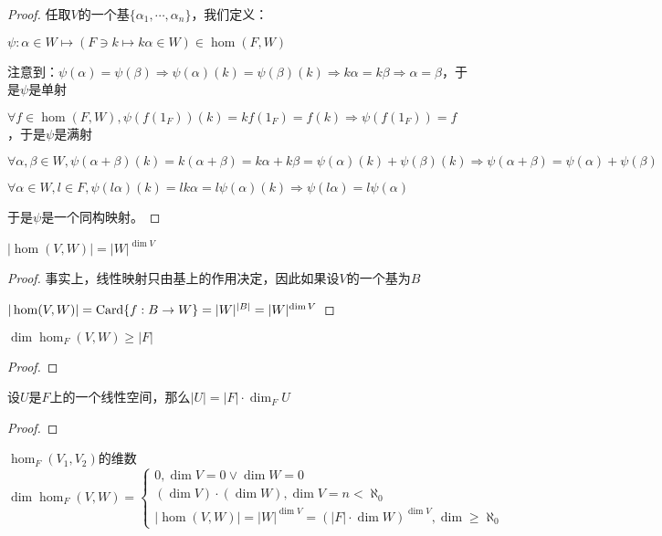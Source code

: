 \documentclass[12pt, a4paper, oneside, UTF8]{ctexbook}
\begin{document}
			\begin{proof}
				任取$V$的一个基$\{\alpha_1,\cdots,\alpha_n\}$，我们定义：

				$\psi : \alpha \in W \mapsto \left(F \ni k \mapsto k\alpha \in W\right) \in \hom(F,W)$

				注意到：$\psi  (\alpha )=\psi  (\beta ) \Rightarrow \psi  (\alpha )(k)=\psi  (\beta )(k) \Rightarrow k\alpha =k\beta \Rightarrow \alpha =\beta $，于是$\psi  $是单射

				$\forall f \in \hom(F,W),\psi  (f(1_F))(k)=kf(1_F)=f(k)\Rightarrow \psi  (f(1_F))=f$，于是$\psi $是满射

				$\forall \alpha ,\beta \in W,\psi (\alpha +\beta )(k)=k(\alpha +\beta )=k\alpha +k\beta =\psi (\alpha )(k)+\psi (\beta )(k) \Rightarrow \psi (\alpha +\beta )=\psi (\alpha )+\psi (\beta )$

				$\forall \alpha \in W,l \in F,\psi (l\alpha )(k)=lk\alpha =l\psi (\alpha )(k) \Rightarrow \psi (l\alpha )=l\psi (\alpha )$

				于是$\psi $是一个同构映射。
			\end{proof}
			\begin{lemma}{}{}
				$|\hom(V,W)|=|W|^{\dim V}$
			\end{lemma}
			\begin{proof}
				事实上，线性映射只由基上的作用决定，因此如果设$V$的一个基为$B$

				$|\hom(V,W)|=\operatorname{Card} \{f:B \to W\}=|W|^{|B|}=|W|^{\dim V}$
			\end{proof}
			\begin{lemma}{}{}
				$\dim \hom_F (V,W) \geqslant |F|$
			\end{lemma}
			\begin{proof}
				
			\end{proof}
			\begin{lemma}{}{}
				设$U$是$F$上的一个线性空间，那么$|U|=|F|\cdot \dim_F U$
			\end{lemma}
			\begin{proof}
				
			\end{proof}
			\begin{them}{$\hom_F (V_1,V_2)$的维数}{}
				$\dim \hom_F (V,W)=\begin{cases}
					0, \dim V = 0 \vee \dim W=0 \\
					(\dim V)\cdot (\dim W),\dim V = n < \aleph_0 \\
					|\hom(V,W)|=|W|^{\dim V} = (|F|\cdot \dim W)^{\dim V},\dim \geqslant \aleph_0
				\end{cases}$
			\end{them}
\end{document}
